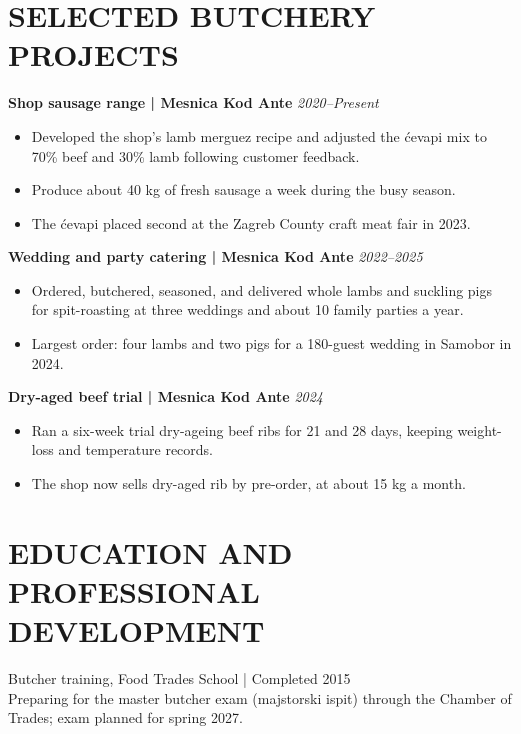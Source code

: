 \documentclass[11pt,a4paper]{article}
\begin{document}
\section*{SELECTED BUTCHERY PROJECTS}
\textbf{Shop sausage range | Mesnica Kod Ante} \hfill \textit{2020--Present}
\begin{itemize}
\item Developed the shop’s lamb merguez recipe and adjusted the ćevapi mix to 70\% beef and 30\% lamb following customer feedback.
\item Produce about 40 kg of fresh sausage a week during the busy season.
\item The ćevapi placed second at the Zagreb County craft meat fair in 2023.
\end{itemize}

\textbf{Wedding and party catering | Mesnica Kod Ante} \hfill \textit{2022--2025}
\begin{itemize}
\item Ordered, butchered, seasoned, and delivered whole lambs and suckling pigs for spit-roasting at three weddings and about 10 family parties a year.
\item Largest order: four lambs and two pigs for a 180-guest wedding in Samobor in 2024.
\end{itemize}

\textbf{Dry-aged beef trial | Mesnica Kod Ante} \hfill \textit{2024}
\begin{itemize}
\item Ran a six-week trial dry-ageing beef ribs for 21 and 28 days, keeping weight-loss and temperature records.
\item The shop now sells dry-aged rib by pre-order, at about 15 kg a month.
\end{itemize}

\section*{EDUCATION AND PROFESSIONAL DEVELOPMENT}
Butcher training, Food Trades School | Completed 2015\\
Preparing for the master butcher exam (majstorski ispit) through the Chamber of Trades; exam planned for spring 2027.
\end{document}
